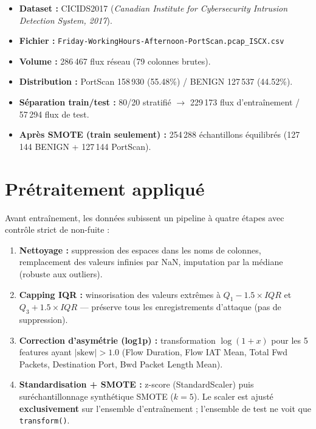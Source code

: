 \documentclass[12pt,a4paper]{article}
\begin{document}
\begin{itemize}[nosep,leftmargin=1.5em]
  \item \textbf{Dataset :} CICIDS2017 (\textit{Canadian Institute for Cybersecurity
        Intrusion Detection System, 2017}).
  \item \textbf{Fichier :} \texttt{Friday-WorkingHours-Afternoon-PortScan.pcap\_ISCX.csv}
  \item \textbf{Volume :} 286\,467 flux r\'{e}seau (79 colonnes brutes).
  \item \textbf{Distribution :} PortScan 158\,930 (55.48\%) / BENIGN 127\,537 (44.52\%).
  \item \textbf{S\'{e}paration train/test :} 80/20 stratifi\'{e} $\rightarrow$
        229\,173 flux d'entra\^{i}nement / 57\,294 flux de test.
  \item \textbf{Apr\`{e}s SMOTE (train seulement) :} 254\,288 \'{e}chantillons
        \'{e}quilibr\'{e}s (127\,144 BENIGN + 127\,144 PortScan).
\end{itemize}

\section{Pr\'{e}traitement appliqu\'{e}}

Avant entra\^{i}nement, les donn\'{e}es subissent un pipeline \`{a} quatre \'{e}tapes
avec contr\^{o}le strict de non-fuite :

\begin{enumerate}[nosep,leftmargin=1.5em]
  \item \textbf{Nettoyage :} suppression des espaces dans les noms de colonnes,
        remplacement des valeurs infinies par NaN, imputation par la m\'{e}diane
        (robuste aux outliers).
  \item \textbf{Capping IQR :} winsorisation des valeurs extr\^{e}mes \`{a}
        $Q_1 - 1.5\times IQR$ et $Q_3 + 1.5\times IQR$ --- pr\'{e}serve tous
        les enregistrements d'attaque (pas de suppression).
  \item \textbf{Correction d'asym\'{e}trie (log1p) :} transformation $\log(1+x)$
        pour les 5 features ayant $|\text{skew}| > 1.0$ (Flow Duration, Flow IAT Mean,
        Total Fwd Packets, Destination Port, Bwd Packet Length Mean).
  \item \textbf{Standardisation + SMOTE :} z-score (StandardScaler) puis sur\'{e}chantillonnage
        synth\'{e}tique SMOTE ($k=5$). Le scaler est ajust\'{e} \textbf{exclusivement}
        sur l'ensemble d'entra\^{i}nement ; l'ensemble de test ne voit que
        \texttt{transform()}.
\end{enumerate}
\end{document}
